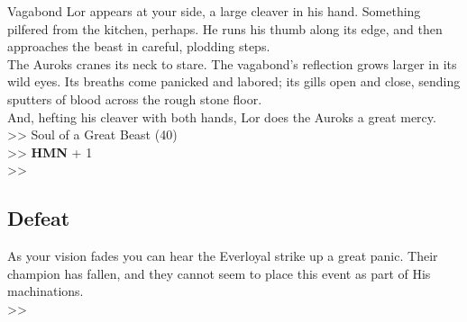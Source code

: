 Vagabond Lor appears at your side, a large cleaver in his hand. Something pilfered from the kitchen, perhaps. He runs his thumb along its edge, and then approaches the beast in careful, plodding steps.\\

The Auroks cranes its neck to stare. The vagabond’s reflection grows larger in its wild eyes. Its breaths come panicked and labored; its gills open and close, sending sputters of blood across the rough stone floor.\\

And, hefting his cleaver with both hands, Lor does the Auroks a great mercy.\\

>> Soul of a Great Beast (40)\\
>> \textbf{HMN} + 1\\
>> 

\subsection*{Defeat}
As your vision fades you can hear the Everloyal strike up a great panic. Their champion has fallen, and they cannot seem to place this event as part of His machinations.\\
>> 